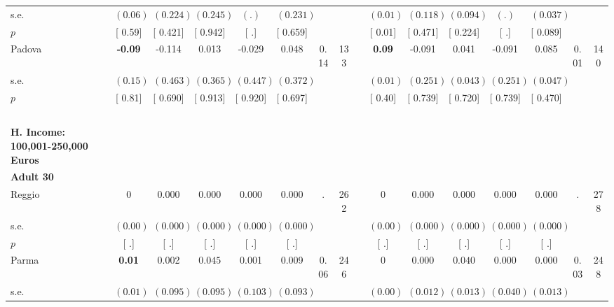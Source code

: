 \begin{longtable}{L{8em} c c c c c c c p{1em} c c c c c c c}
\quad \quad \quad \quad s.e.& $ (     0.06)$ & $ (    0.224)$ & $ (    0.245)$ & $ (        .)$ & $ (    0.231)$ & & & & $ (     0.01)$ & $ (    0.118)$ & $ (    0.094)$ & $ (        .)$ & $ (    0.037)$ & &  \\*
\quad \quad \quad \quad $ p$ & [     0.59] & [    0.421] & [    0.942] & [        .] & [    0.659] & & & & [     0.01] & [    0.471] & [    0.224] & [        .] & [    0.089] & &  \\[1em]
\quad \quad \quad Padova& \textbf{    -0.09} &    -0.114 &     0.013 &    -0.029 &     0.048 &      0.14 &       133 & & \textbf{     0.09} &    -0.091 &     0.041 &    -0.091 &     0.085 &      0.01 &       140  \\*
\quad \quad \quad \quad s.e.& $ (     0.15)$ & $ (    0.463)$ & $ (    0.365)$ & $ (    0.447)$ & $ (    0.372)$ & & & & $ (     0.01)$ & $ (    0.251)$ & $ (    0.043)$ & $ (    0.251)$ & $ (    0.047)$ & &  \\*
\quad \quad \quad \quad $ p$ & [     0.81] & [    0.690] & [    0.913] & [    0.920] & [    0.697] & & & & [     0.40] & [    0.739] & [    0.720] & [    0.739] & [    0.470] & &  \\[1em]
~\\[1em]
\textbf{H. Income: 100,001-250,000 Euros} \\*
\quad \quad \textbf{Adult 30} & & & & & & & & & & & & & & & \\* 
\quad \quad \quad Reggio& 0 &     0.000 &     0.000 &     0.000 &     0.000 &         . &       262 & & 0 &     0.000 &     0.000 &     0.000 &     0.000 &         . &       278  \\*
\quad \quad \quad \quad s.e.& $ (     0.00)$ & $ (    0.000)$ & $ (    0.000)$ & $ (    0.000)$ & $ (    0.000)$ & & & & $ (     0.00)$ & $ (    0.000)$ & $ (    0.000)$ & $ (    0.000)$ & $ (    0.000)$ & &  \\*
\quad \quad \quad \quad $ p$ & [        .] & [        .] & [        .] & [        .] & [        .] & & & & [        .] & [        .] & [        .] & [        .] & [        .] & &  \\[1em]
\quad \quad \quad Parma& \textbf{     0.01} &     0.002 & $ \mathbf{    0.045}$ &     0.001 &     0.009 &      0.06 &       246 & & 0 &     0.000 & $ \mathbf{    0.040}$ &     0.000 &     0.000 &      0.03 &       248  \\*
\quad \quad \quad \quad s.e.& $ (     0.01)$ & $ (    0.095)$ & $ (    0.095)$ & $ (    0.103)$ & $ (    0.093)$ & & & & $ (     0.00)$ & $ (    0.012)$ & $ (    0.013)$ & $ (    0.040)$ & $ (    0.013)$ & &  \\*

\end{longtable}

